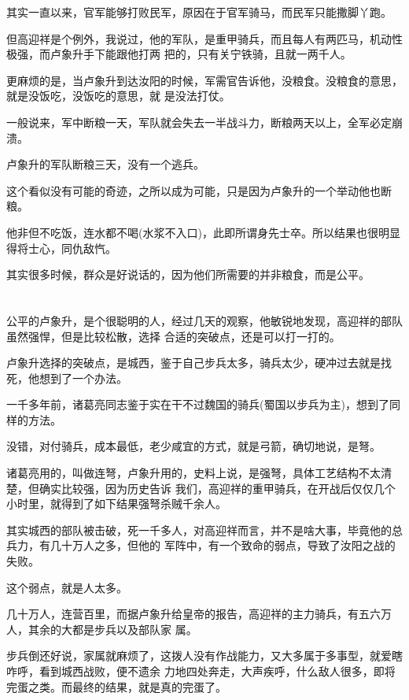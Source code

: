\documentclass[11pt,a4paper,onecolumn]{article}
\begin{document}
其实一直以来，官军能够打败民军，原因在于官军骑马，而民军只能撒脚丫跑。

但高迎祥是个例外，我说过，他的军队，是重甲骑兵，而且每人有两匹马，机动性极强，而卢象升手下能跟他打两
把的，只有关宁铁骑，且就一两千人。

更麻烦的是，当卢象升到达汝阳的时候，军需官告诉他，没粮食。没粮食的意思，就是没饭吃，没饭吃的意思，就
是没法打仗。

一般说来，军中断粮一天，军队就会失去一半战斗力，断粮两天以上，全军必定崩溃。

卢象升的军队断粮三天，没有一个逃兵。

这个看似没有可能的奇迹，之所以成为可能，只是因为卢象升的一个举动\myrule 他也断粮。

他非但不吃饭，连水都不喝(水浆不入口)，此即所谓身先士卒。所以结果也很明显\myrule 得将士心，同仇敌忾。

其实很多时候，群众是好说话的，因为他们所需要的并非粮食，而是公平。

\section[\thesection]{}

公平的卢象升，是个很聪明的人，经过几天的观察，他敏锐地发现，高迎祥的部队虽然强悍，但是比较松散，选择
合适的突破点，还是可以打一打的。

卢象升选择的突破点，是城西，鉴于自己步兵太多，骑兵太少，硬冲过去就是找死，他想到了一个办法。

一千多年前，诸葛亮同志鉴于实在干不过魏国的骑兵(蜀国以步兵为主)，想到了同样的方法。

没错，对付骑兵，成本最低，老少咸宜的方式，就是弓箭，确切地说，是弩。

诸葛亮用的，叫做连弩，卢象升用的，史料上说，是强弩，具体工艺结构不太清楚，但确实比较强，因为历史告诉
我们，高迎祥的重甲骑兵，在开战后仅仅几个小时里，就得到了如下结果\myrule 强弩杀贼千余人。

其实城西的部队被击破，死一千多人，对高迎祥而言，并不是啥大事，毕竟他的总兵力，有几十万人之多，但他的
军阵中，有一个致命的弱点，导致了汝阳之战的失败。

这个弱点，就是人太多。

几十万人，连营百里，而据卢象升给皇帝的报告，高迎祥的主力骑兵，有五六万人，其余的大都是步兵以及部队家
属。

步兵倒还好说，家属就麻烦了，这拨人没有作战能力，又大多属于多事型，就爱瞎咋呼，看到城西战败，便不遗余
力地四处奔走，大声疾呼，什么敌人很多，即将完蛋之类。而最终的结果，就是真的完蛋了。
\end{document}
